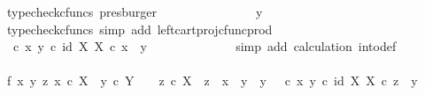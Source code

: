 \begin{isabellebody}
\ {\isacharparenleft}{\kern0pt}typecheck{\isacharunderscore}{\kern0pt}cfuncs{\isacharcomma}{\kern0pt}\ presburger{\isacharparenright}{\kern0pt}\isanewline
\ \ \ \ \ \ \ \ \ \ \isamarkupfalse%
\ \isamarkupfalse%
\ {\isachardoublequoteopen}{\isachardot}{\kern0pt}{\isachardot}{\kern0pt}{\isachardot}{\kern0pt}\ {\isacharequal}{\kern0pt}\ y{\isachardoublequoteclose}\isanewline
\ \ \ \ \ \ \ \ \ \ \ \ \isamarkupfalse%
\ {\isacharparenleft}{\kern0pt}typecheck{\isacharunderscore}{\kern0pt}cfuncs{\isacharcomma}{\kern0pt}\ simp\ add{\isacharcolon}{\kern0pt}\ left{\isacharunderscore}{\kern0pt}cart{\isacharunderscore}{\kern0pt}proj{\isacharunderscore}{\kern0pt}cfunc{\isacharunderscore}{\kern0pt}prod{\isacharparenright}{\kern0pt}\isanewline
\ \ \ \ \ \ \ \ \ \ \isamarkupfalse%
\ \isamarkupfalse%
\ {\isachardoublequoteopen}{\isacharparenleft}{\kern0pt}{\isasymTheta}\ {\isasymcirc}\isactrlsub c\ {\isasymlangle}x{\isacharcomma}{\kern0pt}\ y{\isasymrangle}{\isacharparenright}{\kern0pt}\isactrlsup {\isasymflat}\ {\isasymcirc}\isactrlsub c\ {\isasymlangle}id\ X{\isacharcomma}{\kern0pt}\ {\isasymbeta}\isactrlbsub X\isactrlesub {\isasymrangle}\ {\isasymcirc}\isactrlsub c\ x\ {\isacharequal}{\kern0pt}\ y{\isachardoublequoteclose}\isanewline
\ \ \ \ \ \ \ \ \ \ \ \ \isamarkupfalse%
\ {\isacharparenleft}{\kern0pt}simp\ add{\isacharcolon}{\kern0pt}\ calculation\ into{\isacharunderscore}{\kern0pt}def{\isacharparenright}{\kern0pt}\isanewline
\ \ \ \ \ \ \ \ \isamarkupfalse%
\isanewline
\ \ \isanewline
\ \ \ \ \ \ \ \ \isamarkupfalse%
\ f{}{\isacharcolon}{\kern0pt}\ {\isachardoublequoteopen}{\isasymAnd}x\ y\ z{\isachardot}{\kern0pt}\ x\ {\isasymin}\isactrlsub c\ X\ {\isasymLongrightarrow}\ y\ {\isasymin}\isactrlsub c\ Y\ \ {\isasymLongrightarrow}\ \ z\ {\isasymin}\isactrlsub c\ X\ {\isasymLongrightarrow}\ z\ {\isasymnoteq}\ x\ {\isasymLongrightarrow}\ y\ {\isasymnoteq}\ y{}\ {\isasymLongrightarrow}\ {\isacharparenleft}{\kern0pt}{\isasymTheta}\ {\isasymcirc}\isactrlsub c\ {\isasymlangle}x{\isacharcomma}{\kern0pt}\ y{\isasymrangle}{\isacharparenright}{\kern0pt}\isactrlsup {\isasymflat}\ {\isasymcirc}\isactrlsub c\ {\isasymlangle}id\ X{\isacharcomma}{\kern0pt}\ {\isasymbeta}\isactrlbsub X\isactrlesub {\isasymrangle}\ {\isasymcirc}\isactrlsub c\ z\ {\isacharequal}{\kern0pt}\ y{}{\isachardoublequoteclose}\isanewline
\ \ \ \ \ \ \ \ \isamarkupfalse%
\ {\isacharminus}{\kern0pt}\ \isanewline
\ \ \ \ \ \ \ \ \ \ \isamarkupfalse%

\end{isabellebody}
